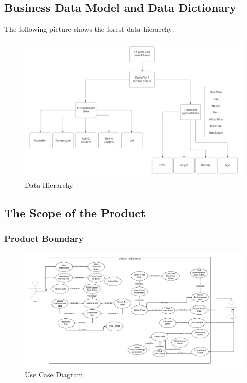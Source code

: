\documentclass{article}
\begin{document}
\subsection{Business Data Model and Data Dictionary}
The following picture shows the forest data hierarchy:
\begin{figure}[H]
    \centering
    \includegraphics[scale = 0.65]{SRS_Pictures/Data-Hierchary.png}
    \caption{Data Hierarchy}
\end{figure}

\newpage

\subsection{The Scope of the Product}
\subsubsection{Product Boundary}
\begin{figure}[H]
    \centering
    \includegraphics[scale=0.28]{SRS_Pictures/Use_Case.png}
    \caption{Use Case Diagram}
    \label{usecase}
\end{figure}
\end{document}
